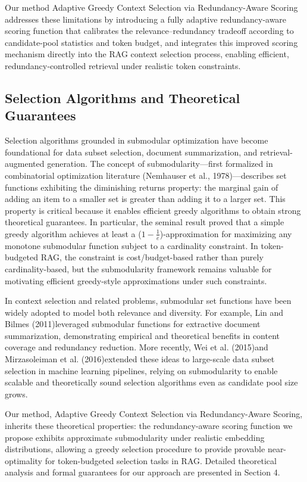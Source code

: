 \documentclass[11pt]{article}
\begin{document}
Our method Adaptive Greedy Context Selection via Redundancy-Aware Scoring addresses these limitations by introducing a fully adaptive redundancy-aware scoring function that calibrates the relevance–redundancy tradeoff according to candidate‑pool statistics and token budget, and integrates this improved scoring mechanism directly into the RAG context selection process, enabling efficient, redundancy‑controlled retrieval under realistic token constraints.

\subsection{Selection Algorithms and Theoretical Guarantees}
Selection algorithms grounded in submodular optimization have become foundational for data subset selection, document summarization, and retrieval-augmented generation. The concept of submodularity—first formalized in combinatorial optimization literature (Nemhauser et al., 1978)\cite{23}—describes set functions exhibiting the diminishing returns property: the marginal gain of adding an item to a smaller set is greater than adding it to a larger set. This property is critical because it enables efficient greedy algorithms to obtain strong theoretical guarantees. In particular, the seminal result proved that a simple greedy algorithm achieves at least a ($1-\frac{1}{e}$)-approximation for maximizing any monotone submodular function subject to a cardinality constraint. In token-budgeted RAG, the constraint is cost/budget-based rather than purely cardinality-based, but the submodularity framework remains valuable for motivating efficient greedy-style approximations under such constraints.

In context selection and related problems, submodular set functions have been widely adopted to model both relevance and diversity. For example, Lin and Bilmes (2011)\cite{24}leveraged submodular functions for extractive document summarization, demonstrating empirical and theoretical benefits in content coverage and redundancy reduction. More recently, Wei et al. (2015)\cite{25}and Mirzasoleiman et al. (2016)\cite{26}extended these ideas to large-scale data subset selection in machine learning pipelines, relying on submodularity to enable scalable and theoretically sound selection algorithms even as candidate pool size grows.

Our method, Adaptive Greedy Context Selection via Redundancy-Aware Scoring, inherits these theoretical properties: the redundancy-aware scoring function we propose exhibits approximate submodularity under realistic embedding distributions, allowing a greedy selection procedure to provide provable near-optimality for token-budgeted selection tasks in RAG. Detailed theoretical analysis and formal guarantees for our approach are presented in Section 4.
\end{document}
